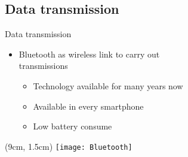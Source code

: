 \subsection{Data transmission}
\begin{frame}{Data transmission}
  \begin{itemize}
   \item Bluetooth as wireless link to carry out\\transmissions
   
   \begin{itemize}
   	\item Technology available for many years now
   	\item Available in every smartphone
   	\item Low battery consume
   \end{itemize}

  \end{itemize}
  
  \begin{textblock*}{5cm}(9cm, 1.5cm)
   \texttt{[image: Bluetooth]}
  \end{textblock*}

\end{frame}
